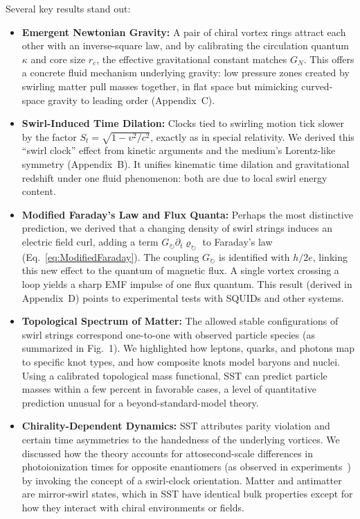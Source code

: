 \documentclass[10pt,reprint,aps,onecolumn,nofootinbib]{revtex4-2}
\newcommand{\rc}{r_c}                                    %
\providecommand{\rc}{r_c}
\begin{document}
Several key results stand out:
\begin{itemize}
\item \textbf{Emergent Newtonian Gravity:} A pair of chiral vortex rings attract each other with an inverse-square law, and by calibrating the circulation quantum $\kappa$ and core size $\rc$, the effective gravitational constant matches $G_N$. This offers a concrete fluid mechanism underlying gravity: low pressure zones created by swirling matter pull masses together, in flat space but mimicking curved-space gravity to leading order (Appendix~C).
\item \textbf{Swirl-Induced Time Dilation:} Clocks tied to swirling motion tick slower by the factor $S_t=\sqrt{1-v^2/c^2}$, exactly as in special relativity. We derived this ``swirl clock'' effect from kinetic arguments and the medium’s Lorentz-like symmetry (Appendix~B). It unifies kinematic time dilation and gravitational redshift under one fluid phenomenon: both are due to local swirl energy content.
\item \textbf{Modified Faraday’s Law and Flux Quanta:} Perhaps the most distinctive prediction, we derived that a changing density of swirl strings induces an electric field curl, adding a term $G_{\circlearrowright}\partial_t\varrho_{\circlearrowright}$ to Faraday’s law (Eq.~\ref{eq:ModifiedFaraday}). The coupling $G_{\circlearrowright}$ is identified with $h/2e$, linking this new effect to the quantum of magnetic flux. A single vortex crossing a loop yields a sharp EMF impulse of one flux quantum. This result (derived in Appendix~D) points to experimental tests with SQUIDs and other systems.
\item \textbf{Topological Spectrum of Matter:} The allowed stable configurations of swirl strings correspond one-to-one with observed particle species (as summarized in Fig.~1). We highlighted how leptons, quarks, and photons map to specific knot types, and how composite knots model baryons and nuclei. Using a calibrated topological mass functional, SST can predict particle masses within a few percent in favorable cases, a level of quantitative prediction unusual for a beyond-standard-model theory.
    \item \textbf{Chirality-Dependent Dynamics:} SST attributes parity violation and certain time asymmetries to the handedness of the underlying vortices. We discussed how the theory accounts for attosecond-scale differences in photoionization times for opposite enantiomers (as observed in experiments~\cite{Han2025}) by invoking the concept of a swirl-clock orientation. Matter and antimatter are mirror-swirl states, which in SST have identical bulk properties except for how they interact with chiral environments or fields.

\end{itemize}
\end{document}
